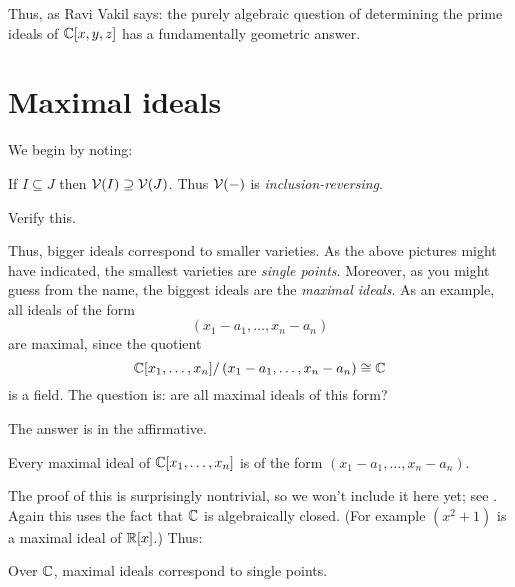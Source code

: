 Thus, as Ravi Vakil \cite{ref:vakil} says:
the purely algebraic question 
of determining the prime ideals of $\mathbb C[x,y,z]$
has a fundamentally geometric answer.

\section{Maximal ideals}
We begin by noting:
\begin{proposition}
	If $I \subseteq J$ then $\mathcal V(I) \supseteq \mathcal V(J)$.
	Thus $\mathcal V(-)$ is \emph{inclusion-reversing}.
\end{proposition}
\begin{ques}
	Verify this.
\end{ques}
Thus, bigger ideals correspond to smaller varieties.
As the above pictures might have indicated,
the smallest varieties are \emph{single points}.
Moreover, as you might guess from the name,
the biggest ideals are the \emph{maximal ideals}.
As an example, all ideals of the form
\[ \left( x_1-a_1, \dots, x_n-a_n \right) \]
are maximal, since the quotient
\[ \mathbb C[x_1, \dots, x_n] / \left( x_1-a_1, \dots, x_n-a_n \right) \cong \mathbb C \]
is a field.
The question is: are all maximal ideals of this form?

The answer is in the affirmative.
\begin{theorem}
	Every maximal ideal of $\mathbb C[x_1, \dots, x_n]$
	is of the form $(x_1-a_1, \dots, x_n-a_n)$.
\end{theorem}
The proof of this is surprisingly nontrivial,
so we won't include it here yet; see \cite[\S7.4.3]{ref:vakil}.
Again this uses the fact that $\mathbb C$ is algebraically closed.
(For example $(x^2+1)$ is a maximal ideal of $\mathbb R[x]$.)
Thus:
\begin{moral}
	Over $\mathbb C$, maximal ideals correspond to single points.
\end{moral}

